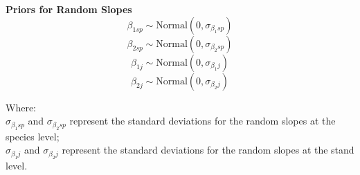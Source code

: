 \documentclass[11pt,letter]{article}
\begin{document}
\textbf{Priors for Random Slopes}
\[
\beta_{1 sp} \sim \text{Normal}(0, \sigma_{\beta_1 sp})
\]
\[
\beta_{2 sp} \sim \text{Normal}(0, \sigma_{\beta_2 sp})
\]
\[
\beta_{1 j} \sim \text{Normal}(0, \sigma_{\beta_1 j})
\]
\[
\beta_{2 j} \sim \text{Normal}(0, \sigma_{\beta_2 j})
\]

Where:\\
\(\sigma_{\beta_1 sp}\) and \(\sigma_{\beta_2 sp}\) represent the standard deviations for the random slopes at the species level;\\
\(\sigma_{\beta_1 j}\) and \(\sigma_{\beta_2 j}\) represent the standard deviations for the random slopes at the stand level.
\end{document}
